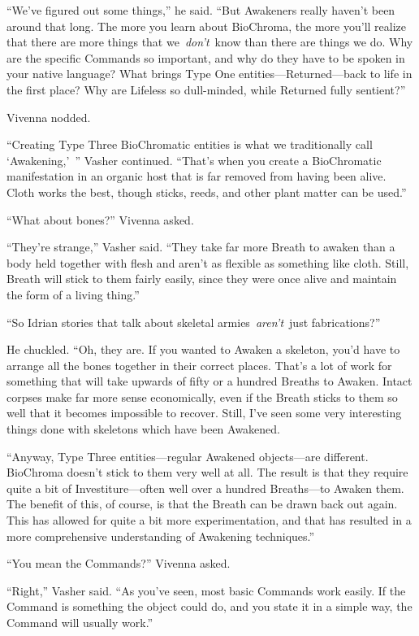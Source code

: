 “We’ve figured out some things,” he said. “But Awakeners really haven’t been around that long. The more you learn about BioChroma, the more you’ll realize that there are more things that we~\textit{don’t}~know than there are things we do. Why are the specific Commands so important, and why do they have to be spoken in your native language? What brings Type One entities—Returned—back to life in the first place? Why are Lifeless so dull-minded, while Returned fully sentient?”

Vivenna nodded.

“Creating Type Three BioChromatic entities is what we traditionally call ‘Awakening,’~” Vasher continued. “That’s when you create a BioChromatic manifestation in an organic host that is far removed from having been alive. Cloth works the best, though sticks, reeds, and other plant matter can be used.”

“What about bones?” Vivenna asked.

“They’re strange,” Vasher said. “They take far more Breath to awaken than a body held together with flesh and aren’t as flexible as something like cloth. Still, Breath will stick to them fairly easily, since they were once alive and maintain the form of a living thing.”

“So Idrian stories that talk about skeletal armies~\textit{aren’t}~just fabrications?”

He chuckled. “Oh, they are. If you wanted to Awaken a skeleton, you’d have to arrange all the bones together in their correct places. That’s a lot of work for something that will take upwards of fifty or a hundred Breaths to Awaken. Intact corpses make far more sense economically, even if the Breath sticks to them so well that it becomes impossible to recover. Still, I’ve seen some very interesting things done with skeletons which have been Awakened.

“Anyway, Type Three entities—regular Awakened objects—are different. BioChroma doesn’t stick to them very well at all. The result is that they require quite a bit of Investiture—often well over a hundred Breaths—to Awaken them. The benefit of this, of course, is that the Breath can be drawn back out again. This has allowed for quite a bit more experimentation, and that has resulted in a more comprehensive understanding of Awakening techniques.”

“You mean the Commands?” Vivenna asked.

“Right,” Vasher said. “As you’ve seen, most basic Commands work easily. If the Command is something the object could do, and you state it in a simple way, the Command will usually work.”

